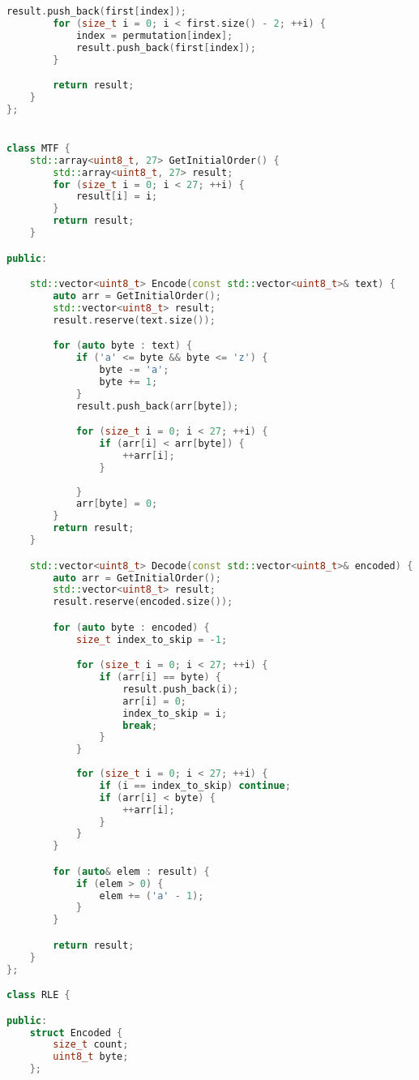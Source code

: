 \begin{lstlisting}[language=C++]
        result.push_back(first[index]);
        for (size_t i = 0; i < first.size() - 2; ++i) {
            index = permutation[index];
            result.push_back(first[index]);
        }

        return result;
    }
};


class MTF {
    std::array<uint8_t, 27> GetInitialOrder() {
        std::array<uint8_t, 27> result;
        for (size_t i = 0; i < 27; ++i) {
            result[i] = i;
        }
        return result;
    }

public:

    std::vector<uint8_t> Encode(const std::vector<uint8_t>& text) {
        auto arr = GetInitialOrder();
        std::vector<uint8_t> result;
        result.reserve(text.size());

        for (auto byte : text) {
            if ('a' <= byte && byte <= 'z') {
                byte -= 'a';
                byte += 1;
            }
            result.push_back(arr[byte]);

            for (size_t i = 0; i < 27; ++i) {
                if (arr[i] < arr[byte]) {
                    ++arr[i];
                }
                
            }
            arr[byte] = 0;
        }
        return result;
    }

    std::vector<uint8_t> Decode(const std::vector<uint8_t>& encoded) {
        auto arr = GetInitialOrder();
        std::vector<uint8_t> result;
        result.reserve(encoded.size());

        for (auto byte : encoded) {
            size_t index_to_skip = -1;

            for (size_t i = 0; i < 27; ++i) {
                if (arr[i] == byte) {
                    result.push_back(i);
                    arr[i] = 0;
                    index_to_skip = i;
                    break;
                }
            }
            
            for (size_t i = 0; i < 27; ++i) {
                if (i == index_to_skip) continue;
                if (arr[i] < byte) {
                    ++arr[i];
                }
            }
        }

        for (auto& elem : result) {
            if (elem > 0) {
                elem += ('a' - 1);
            }
        }

        return result;
    }
};

class RLE {

public:
    struct Encoded {
        size_t count;
        uint8_t byte;
    };


\end{lstlisting}
